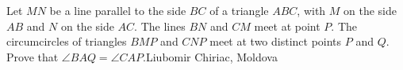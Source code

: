 Let $ MN$ be a line parallel to the side $ BC$ of a triangle $ ABC$,  with $ M$ on the side $ AB$ and $ N$ on the side $ AC$. The lines $ BN$ and $ CM$ meet at point $ P$. The circumcircles of triangles $ BMP$ and $ CNP$ meet at two distinct points $ P$ and $ Q$. Prove that $ \angle BAQ = \angle CAP$.Liubomir Chiriac, Moldova